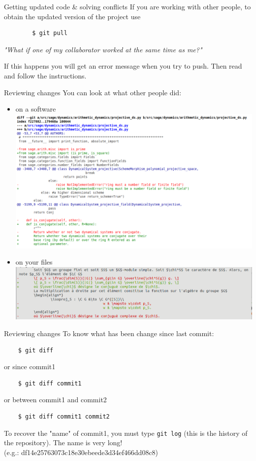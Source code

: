 \documentclass{beamer}
\begin{document}
	\begin{frame}[fragile]{Getting updated code \& solving conflicts}
		If you are working with other people, to obtain the updated version of the project use 
		\begin{verbatim}
		$ git pull
		\end{verbatim}
		
		\textit{"What if one of my collaborator worked at the same time as me?"}
		
		If this happens you will get an error message when you try to push. Then read and follow the instructions. 
	\end{frame}

	\begin{frame}{Reviewing changes}
	You can look at what other people did:
	\begin{itemize}
		\item on a software\\
		\includegraphics[width=0.8\linewidth]{diff_on_sage_2}  %
		\item on your files\\
		\includegraphics[width=0.8\linewidth]{diff_on_latex}
	\end{itemize}
	\end{frame}

	\begin{frame}[fragile]{Reviewing changes}
	To know what has been change since last commit:
	\begin{verbatim}
	$ git diff
	\end{verbatim}
	or since commit1 
	\begin{verbatim}
	$ git diff commit1
	\end{verbatim}
	or between commit1 and commit2
	\begin{verbatim}
	$ git diff commit1 commit2
	\end{verbatim}
	\begin{tcolorbox}[colback=cyan!30]
	To recover the "name" of commit1, you must type \texttt{git log} (this is the history of the repository). The name is very long!\\
	(e.g.: df14e25763073c18e30ebeede3d34ef466dd08c8)
	\end{tcolorbox}
	\end{frame}
\end{document}
